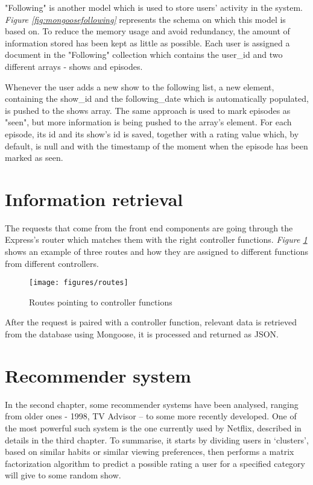 "Following" is another model which is used to store users' activity in the system. \textit{Figure \ref{fig:mongoosefollowing}} represents the schema on which this model is based on. To reduce the memory usage and avoid redundancy, the amount of information stored has been kept as little as possible. Each user is assigned a document in the "Following" collection which contains the user\_id and two different arrays - shows and episodes.

Whenever the user adds a new show to the following list, a new element, containing the show\_id and the following\_date which is automatically populated, is pushed to the shows array. The same approach is used to mark episodes as "seen", but more information is being pushed to the array's element. For each episode, its id and its show's id is saved, together with a rating value which, by default, is null and with the timestamp of the moment when the episode has been marked as seen.

\section{Information retrieval}

The requests that come from the front end components are going through the Express's router which matches them with the right controller functions. \textit{Figure \ref{fig:routes}} shows an example of three routes and how they are assigned to different functions from different controllers.

\begin{figure}[h]
\centering
\texttt{[image: figures/routes]}
\caption{Routes pointing to controller functions}
\label{fig:routes}
\end{figure}

After the request is paired with a controller function, relevant data is retrieved from the database using Mongoose, it is processed and returned as JSON.

\section{Recommender system}

In the second chapter, some recommender systems have been analysed, ranging from older ones - 1998, TV Advisor – to some more recently developed. One of the most powerful such system is the one currently used by Netflix, described in details in the third chapter. To summarise, it starts by dividing users in ‘clusters', based on similar habits or similar viewing preferences, then performs a matrix factorization algorithm to predict a possible rating a user for a specified category will give to some random show.

